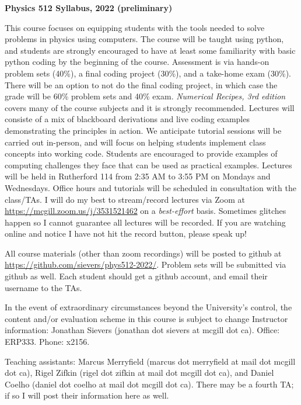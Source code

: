 \documentclass[12]{article}
\begin{document}

\begin{center}{\bf Physics 512 Syllabus, 2022 (preliminary)}
\end{center}
\vskip 0.1in 
This course focuses on equipping students with the tools
needed to solve problems in physics using computers.  The course will
be taught using python, and students are strongly encouraged to have
at least some familiarity with basic python coding by the beginning of
the course.  Assessment is via hands-on problem sets (40\%), a final
coding project (30\%), and a take-home exam (30\%).  There will be an
option to not do the final coding project, in which case the grade
will be 60\% problem sets and 40\% exam.  
{\textit{Numerical Recipes, 3rd edition}} covers many of the course
subjects and it is strongly recommended.  Lectures will consiste of a
mix of blackboard derivations and live coding examples demonstrating
the principles in action.  We anticipate tutorial sessions will be
carried out in-person, and will focus on helping students implement
class concepts into working code.  Students are encouraged to provide
examples of computing challenges they face that can be used as practical examples. 
\vskip 0.1in
\noindent Lectures will be held in Rutherford 114 from 2:35 AM to 3:55
PM on Mondays and Wednesdays. Office hours and tutorials will be
scheduled in consultation with the class/TAs.  I will do my best to
stream/record lectures via Zoom at
\url{https://mcgill.zoom.us/j/3531521462} on a \textit{best-effort}
basis.  Sometimes glitches happen so I cannot guarantee all lectures
will be recorded.  If you are watching online and notice I have not
hit the record button, please speak up!


\noindent All course materials (other than zoom recordings) will be posted to github at
\url{https://github.com/sievers/phys512-2022/}.  Problem sets will be
submitted via github as well.  Each student should get a github account, and
email their username to the TAs.  

\vskip 0.1in
\noindent In the event of extraordinary circumstances beyond the University's
control, the content and/or evaluation scheme in this course is
subject to change
\vskip 0.1in
\noindent
Instructor information:  Jonathan Sievers (jonathan dot sievers at
mcgill dot ca).  Office: ERP333.  Phone: x2156.
\vskip 0.1in

\noindent
Teaching assistants:  Marcus Merryfield (marcus dot merryfield at
mail dot mcgill dot ca), Rigel Zifkin (rigel dot zifkin at mail dot
mcgill dot ca), and Daniel Coelho (daniel dot coelho at mail dot
mcgill dot ca).  There may be a fourth TA; if so I will post their
information here as well.
\end{document}
